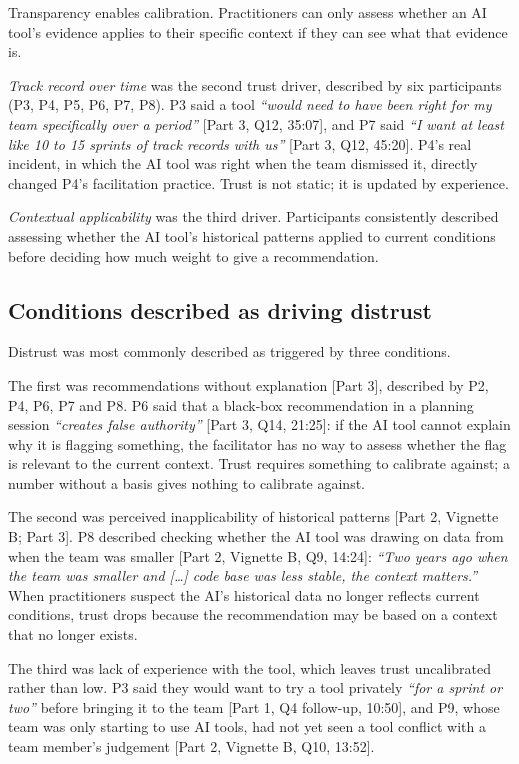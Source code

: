 \documentclass[a4paper,twoside]{bth}
\begin{document}
Transparency enables calibration. Practitioners can only assess whether an AI tool's evidence applies to their specific context if they can see what that evidence is.

\textit{Track record over time} was the second trust driver, described by six participants (P3, P4, P5, P6, P7, P8). P3 said a tool \textit{``would need to have been right for my team specifically over a period''} [Part 3, Q12, 35:07], and P7 said \textit{``I want at least like 10 to 15 sprints of track records with us''} [Part 3, Q12, 45:20]. P4's real incident, in which the AI tool was right when the team dismissed it, directly changed P4's facilitation practice. Trust is not static; it is updated by experience.

\textit{Contextual applicability} was the third driver. Participants consistently described assessing whether the AI tool's historical patterns applied to current conditions before deciding how much weight to give a recommendation.

\subsection{Conditions described as driving distrust}

Distrust was most commonly described as triggered by three conditions.

The first was recommendations without explanation [Part 3], described by P2, P4, P6, P7 and P8. P6 said that a black-box recommendation in a planning session \textit{``creates false authority''} [Part 3, Q14, 21:25]: if the AI tool cannot explain why it is flagging something, the facilitator has no way to assess whether the flag is relevant to the current context. Trust requires something to calibrate against; a number without a basis gives nothing to calibrate against.

The second was perceived inapplicability of historical patterns [Part 2, Vignette B; Part 3]. P8 described checking whether the AI tool was drawing on data from when the team was smaller [Part 2, Vignette B, Q9, 14:24]: \textit{``Two years ago when the team was smaller and {[}\ldots{]} code base was less stable, the context matters.''} When practitioners suspect the AI's historical data no longer reflects current conditions, trust drops because the recommendation may be based on a context that no longer exists.

The third was lack of experience with the tool, which leaves trust uncalibrated rather than low. P3 said they would want to try a tool privately \textit{``for a sprint or two''} before bringing it to the team [Part 1, Q4 follow-up, 10:50], and P9, whose team was only starting to use AI tools, had not yet seen a tool conflict with a team member's judgement [Part 2, Vignette B, Q10, 13:52].
\end{document}
